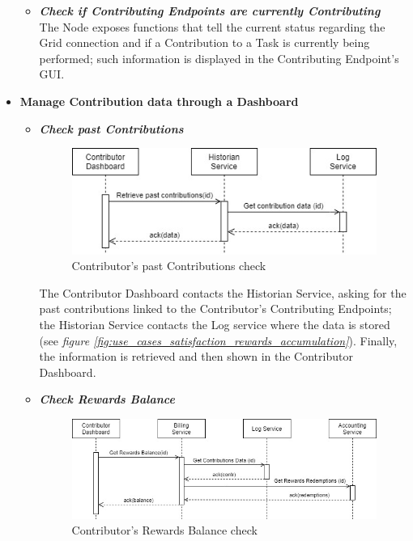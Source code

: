 \begin{itemize}
\begin{itemize}
        \item \textbf{\textit{Check if Contributing Endpoints are currently Contributing}}\\
        The Node exposes functions that tell the current status regarding the Grid connection and if a Contribution to a Task is currently being performed; such information is displayed in the Contributing Endpoint's GUI.

    \end{itemize}
    \item \textbf{Manage Contribution data through a Dashboard}
    \begin{itemize}
        \item \textbf{\textit{Check past Contributions}}\\
        \begin{figure}[!ht]
            \centering
            \includegraphics[scale=0.65]{document/chapters/chapter_6/images/use_cases_satisfaction_past_contributions_check.jpg}
            \caption{Contributor's past Contributions check}
            \label{fig:use_cases_satisfaction_past_contributions_check}
        \end{figure}

        The Contributor Dashboard contacts the Historian Service, asking for the past contributions linked to the Contributor's Contributing Endpoints; the Historian Service contacts the Log service where the data is stored (see \textit{figure \ref{fig:use_cases_satisfaction_rewards_accumulation}}). Finally, the information is retrieved and then shown in the Contributor Dashboard.

        \item \textbf{\textit{Check Rewards Balance}}\\
        \begin{figure}[!ht]
            \centering
            \includegraphics[scale=0.6]{document/chapters/chapter_6/images/use_cases_satisfaction_rewards_balance.jpg}
            \caption{Contributor's Rewards Balance check}
            \label{fig:use_cases_satisfaction_rewards_balance}
        \end{figure}


\end{itemize}
\end{itemize}
